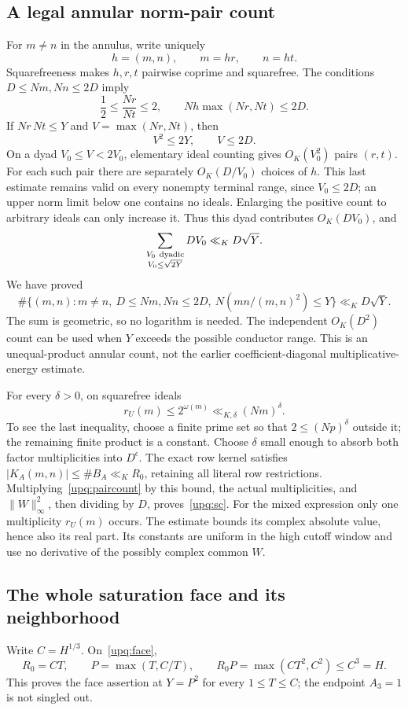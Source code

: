 \subsection{A legal annular norm-pair count}
For $m\ne n$ in the annulus, write uniquely
\[
 h=(m,n),\qquad m=hr,\qquad n=ht.
\]
Squarefreeness makes $h,r,t$ pairwise coprime and squarefree. The conditions
$D\le Nm,Nn\le2D$ imply
\[
 \frac12\le\frac{Nr}{Nt}\le2,\qquad
 Nh\max(Nr,Nt)\le2D.
\]
If $Nr\,Nt\le Y$ and $V=\max(Nr,Nt)$, then
\[
 V^2\le2Y,\qquad V\le2D.
\]
On a dyad $V_0\le V<2V_0$, elementary ideal counting gives
$O_K(V_0^2)$ pairs $(r,t)$. For each such pair there are separately
$O_K(D/V_0)$ choices of $h$. This last estimate remains valid on every
nonempty terminal range, since $V_0\le2D$; an upper norm limit below one
contains no ideals. Enlarging the positive count to arbitrary ideals
can only increase it. Thus this dyad contributes $O_K(DV_0)$, and
\[
 \sum_{\substack{V_0\ {\rm dyadic}\\V_0\le\sqrt{2Y}}}
       DV_0\ll_K D\sqrt Y.
\]
We have proved
\begin{equation}\label{upq:paircount}
 \#\{(m,n):m\ne n,\ D\le Nm,Nn\le2D,\
             N(mn/(m,n)^2)\le Y\}\ll_K D\sqrt Y.
\end{equation}
The sum is geometric, so no logarithm is needed. The independent
$O_K(D^2)$ count can be used when $Y$ exceeds the possible conductor
range. This is an unequal-product annular count, not the earlier
coefficient-diagonal multiplicative-energy estimate.

For every $\delta>0$, on squarefree ideals
\[
 r_U(m)\le2^{\omega(m)}\ll_{K,\delta}(Nm)^\delta.
\]
To see the last inequality, choose a finite prime set so that
$2\le(Np)^\delta$ outside it; the remaining finite product is a constant.
Choose $\delta$ small enough to absorb both factor multiplicities into
$D^\epsilon$. The exact row kernel satisfies
$|K_A(m,n)|\le\#B_A\ll_K R_0$, retaining all literal row restrictions.
Multiplying~\eqref{upq:paircount} by this bound, the actual multiplicities,
and $\|W\|_\infty^2$, then dividing by $D$, proves~\eqref{upq:sc}.
For the mixed expression only one multiplicity $r_U(m)$ occurs.
The estimate bounds its complex absolute value, hence also its real part.
Its constants are uniform in the high cutoff window and use no derivative
of the possibly complex common $W$.

\subsection{The whole saturation face and its neighborhood}
Write $C=H^{1/3}$. On~\eqref{upq:face},
\[
 R_0=CT,\qquad P=\max(T,C/T),\qquad
 R_0P=\max(CT^2,C^2)\le C^3=H.
\]
This proves the face assertion at $Y=P^2$ for every $1\le T\le C$;
the endpoint $A_3=1$ is not singled out.

